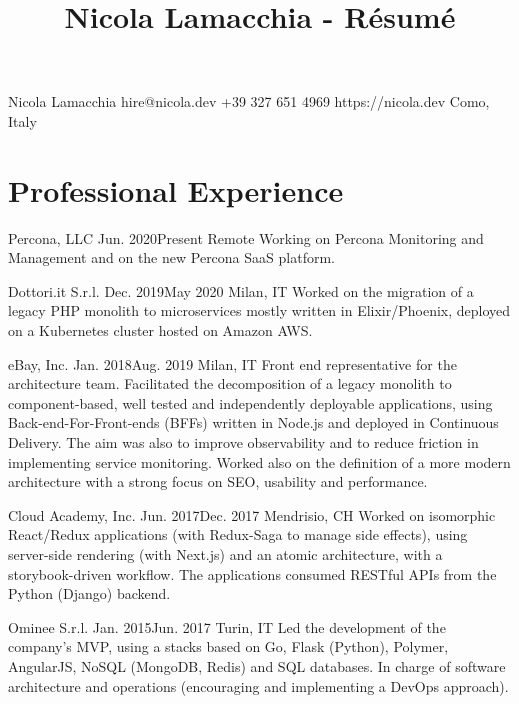\documentclass{resume}
\begin{document}
\title{Nicola Lamacchia - Résumé}

\heading%
    {Nicola}
    {Lamacchia}
    {}
    {hire@nicola.dev}%
    {+39 327 651 4969}%
    {https://nicola.dev}
    {Como, Italy}

\separator[cvlightgray]


\section{Professional Experience}

%
    {Percona, LLC}%
    {Jun. 2020}{Present}%
    {Remote}%
    {Working on Percona Monitoring and Management and on the new Percona SaaS
        platform.}

%
    {Dottori.it S.r.l.}%
    {Dec. 2019}{May 2020}%
    {Milan, IT}%
    {Worked on the migration of a legacy PHP monolith to microservices mostly
        written in Elixir/Phoenix, deployed on a Kubernetes cluster hosted on
        Amazon AWS.}

%
    {eBay, Inc.}%
    {Jan. 2018}{Aug. 2019}%
    {Milan, IT}%
    {Front end representative for the architecture team. Facilitated the
        decomposition of a legacy monolith to component-based, well tested and
        independently deployable applications, using Back-end-For-Front-ends
        (BFFs) written in Node.js and deployed in Continuous Delivery. The aim
        was also to improve observability and to reduce friction in
        implementing service monitoring. Worked also on the definition of a
        more modern architecture with a strong focus on SEO, usability and
        performance.}

%
    {Cloud Academy, Inc.}%
    {Jun. 2017}{Dec. 2017}%
    {Mendrisio, CH}%
    {Worked on isomorphic React/Redux applications (with Redux-Saga to manage
        side effects), using server-side rendering (with Next.js) and an atomic
        architecture, with a storybook-driven workflow. The applications
        consumed RESTful APIs from the Python (Django) backend.}

%
    {Ominee S.r.l.}%
    {Jan. 2015}{Jun. 2017}%
    {Turin, IT}%
    {Led the development of the company’s MVP, using a stacks based on Go,
        Flask (Python), Polymer, AngularJS, NoSQL (MongoDB, Redis) and SQL
        databases. In charge of software architecture and operations
        (encouraging and implementing a DevOps approach).}
\end{document}
